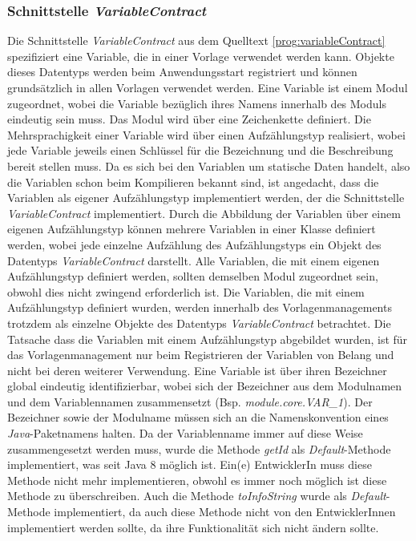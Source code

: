 \subsubsection{Schnittstelle \emph{VariableContract}}
\label{sec:variableContract}
Die Schnittstelle \emph{VariableContract} aus dem Quelltext \ref{prog:variableContract} spezifiziert eine Variable, die in einer Vorlage verwendet werden kann. Objekte dieses Datentyps werden beim Anwendungsstart registriert und können grundsätzlich in allen Vorlagen verwendet werden. Eine Variable ist einem Modul zugeordnet, wobei die Variable bezüglich ihres Namens innerhalb des Moduls eindeutig sein muss. Das Modul wird über eine Zeichenkette definiert. Die Mehrsprachigkeit einer Variable wird über einen Aufzählungstyp realisiert, wobei jede Variable jeweils einen Schlüssel für die Bezeichnung und die Beschreibung bereit stellen muss.
\newline
\newline
Da es sich bei den Variablen um statische Daten handelt, also die Variablen schon beim Kompilieren bekannt sind, ist angedacht, dass die Variablen als eigener Aufzählungstyp implementiert werden, der die Schnittstelle \emph{VariableContract} implementiert. Durch die Abbildung der Variablen über einem eigenen Aufzählungstyp können mehrere Variablen in einer Klasse definiert werden, wobei jede einzelne Aufzählung des Aufzählungstyps ein Objekt des Datentyps \emph{VariableContract} darstellt. Alle Variablen, die mit einem eigenen Aufzählungstyp definiert werden, sollten demselben Modul zugeordnet sein, obwohl dies nicht zwingend erforderlich ist. Die Variablen, die mit einem Aufzählungstyp definiert wurden, werden innerhalb des Vorlagenmanagements trotzdem als einzelne Objekte des Datentyps  \emph{VariableContract} betrachtet. Die Tatsache dass die Variablen mit einem Aufzählungstyp abgebildet wurden, ist für das Vorlagenmanagement nur beim Registrieren der Variablen von Belang und nicht bei deren weiterer Verwendung.
\newline
\newline
Eine Variable ist über ihren Bezeichner global eindeutig identifizierbar, wobei sich der Bezeichner aus dem Modulnamen und dem Variablennamen zusammensetzt (Bsp. \emph{module.core.VAR\_1}). Der Bezeichner sowie der Modulname müssen sich an die Namenskonvention eines \emph{Java}-Paketnamens halten. Da der Variablenname immer auf diese Weise zusammengesetzt werden muss, wurde die Methode \emph{getId} als \emph{Default}-Methode implementiert, was seit Java 8 möglich ist. Ein(e) EntwicklerIn muss diese Methode nicht mehr implementieren, obwohl es immer noch möglich ist diese Methode zu überschreiben. Auch die Methode \emph{toInfoString} wurde als \emph{Default}-Methode implementiert, da auch diese Methode nicht von den EntwicklerInnen implementiert werden sollte, da ihre Funktionalität sich nicht ändern sollte.
